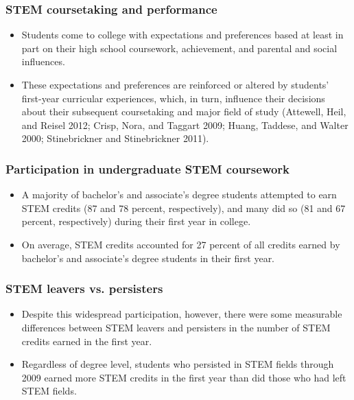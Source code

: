 \documentclass{beamer}
\begin{document}
\begin{frame}
  \frametitle{STEM coursetaking and performance}
  \begin{itemize}
  \item Students come to college with expectations and preferences based at least in part on
    their high school coursework, achievement, and parental and social influences.
    
  \item These expectations and preferences are reinforced or altered by students’ first-year curricular
experiences, which, in turn, influence their decisions about their subsequent
coursetaking and major field of study (Attewell, Heil, and Reisel 2012; Crisp, Nora,
and Taggart 2009; Huang, Taddese, and Walter 2000; Stinebrickner and
Stinebrickner 2011).
\end{itemize}
\end{frame}

\begin{frame}
  \frametitle{Participation in undergraduate STEM coursework}

  \begin{itemize}
  \item A majority of bachelor’s and associate’s degree students attempted to earn STEM
credits (87 and 78 percent, respectively), and many did so (81 and 67 percent,
respectively) during their first year in college. 

\item On average, STEM credits accounted for 27 percent of all credits earned by bachelor’s and associate’s degree
students in their first year. 
  \end{itemize}
\end{frame}

\begin{frame}
  \frametitle{STEM leavers vs. persisters}
  \begin{itemize}
  \item Despite this widespread participation, however, there were some measurable
differences between STEM leavers and persisters in the number of STEM credits
earned in the first year. 

\item Regardless of degree level, students who persisted in STEM
fields through 2009 earned more STEM credits in the first year than did those who
had left STEM fields. 
  \end{itemize}
\end{frame}
\end{document}
